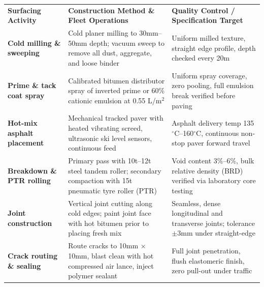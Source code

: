 \documentclass[a4paper,11pt]{article}
\begin{document}
{\fontsize{7.7pt}{9.8pt}\selectfont
\renewcommand{\arraystretch}{1.23}
\noindent
\begin{tabularx}{\textwidth}{@{}p{3.3cm} p{6.6cm} X@{}}
\rowcolor{mhnavy}
{\color{white}\bfseries Surfacing Activity} & {\color{white}\bfseries Construction Method \& Fleet Operations} & {\color{white}\bfseries Quality Control / Specification Target} \\
\rowcolor{mhbluelight}
\bfseries Cold milling \& sweeping & Cold planer milling to 30mm--50mm depth; vacuum sweep to remove all dust, aggregate, and loose binder & Uniform milled texture, straight edge profile, depth checked every 20m \\
\bfseries Prime \& tack coat spray & Calibrated bitumen distributor spray of inverted prime or 60\% cationic emulsion at 0.55 L/m$^2$ & Uniform spray coverage, zero pooling, full emulsion break verified before paving \\
\rowcolor{mhbluelight}
\bfseries Hot-mix asphalt placement & Mechanical tracked paver with heated vibrating screed, ultrasonic ski level sensors, continuous feed & Asphalt delivery temp 135$^\circ$C--160$^\circ$C, continuous non-stop paver forward travel \\
\bfseries Breakdown \& PTR rolling & Primary pass with 10t--12t steel tandem roller; secondary compaction with 15t pneumatic tyre roller (PTR) & Void content 3\%--6\%, bulk relative density (BRD) verified via laboratory core testing \\
\rowcolor{mhbluelight}
\bfseries Joint construction & Vertical joint cutting along cold edges; paint joint face with hot bitumen prior to placing fresh mix & Seamless, dense longitudinal and transverse joints; tolerance $\pm$3mm under straight-edge \\
\bfseries Crack routing \& sealing & Route cracks to 10mm $\times$ 10mm, blast clean with hot compressed air lance, inject polymer sealant & Full joint penetration, flush elastomeric finish, zero pull-out under traffic \\
\end{tabularx}
\renewcommand{\arraystretch}{1}
}

\vfill
\end{document}
